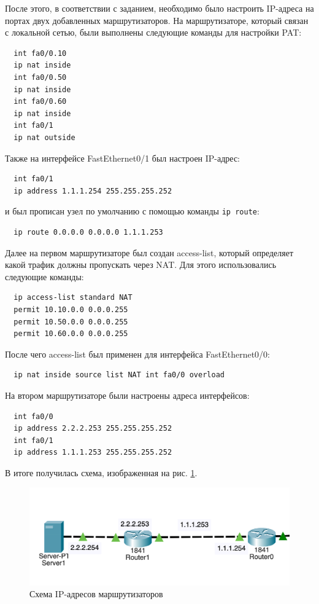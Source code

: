 \documentclass[a4paper, 14pt]{extarticle}
\begin{document}
После этого, в соответствии с заданием, необходимо было настроить IP-адреса на
портах двух добавленных маршрутизаторов. На маршрутизаторе, который связан с
локальной сетью, были выполнены следующие команды для настройки PAT:
\begin{verbatim}
  int fa0/0.10
  ip nat inside
  int fa0/0.50
  ip nat inside
  int fa0/0.60
  ip nat inside
  int fa0/1
  ip nat outside
\end{verbatim}
Также на интерфейсе FastEthernet0/1 был настроен IP-адрес:
\begin{verbatim}
  int fa0/1
  ip address 1.1.1.254 255.255.255.252
\end{verbatim}
и был прописан узел по умолчанию с помощью команды \texttt{ip route}:
\begin{verbatim}
  ip route 0.0.0.0 0.0.0.0 1.1.1.253
\end{verbatim}

Далее на первом маршрутизаторе был создан access-list, который определяет какой
трафик должны пропускать через NAT. Для этого использовались следующие команды:
\begin{verbatim}
  ip access-list standard NAT
  permit 10.10.0.0 0.0.0.255
  permit 10.50.0.0 0.0.0.255
  permit 10.60.0.0 0.0.0.255
\end{verbatim}
После чего access-list был применен для интерфейса FastEthernet0/0:
\begin{verbatim}
  ip nat inside source list NAT int fa0/0 overload
\end{verbatim}

На втором маршрутизаторе были настроены адреса интерфейсов:
\begin{verbatim}
  int fa0/0
  ip address 2.2.2.253 255.255.255.252
  int fa0/1
  ip address 1.1.1.253 255.255.255.252
\end{verbatim}

В итоге получилась схема, изображенная на рис. \ref{fig:ip}.

\begin{figure}[H]
  \centering
  \includegraphics[width=\textwidth]{images/ip.png}
  \caption{Схема IP-адресов маршрутизаторов}
  \label{fig:ip}
\end{figure}
\end{document}
